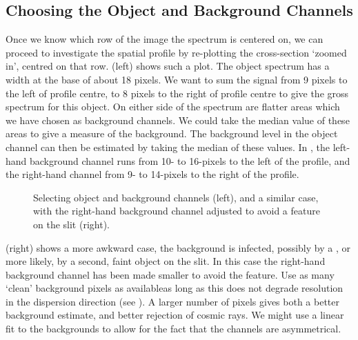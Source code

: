 \subsection{Choosing the Object and Background
            Channels}

Once we know which row of the image the spectrum is centered on, we can
proceed to investigate the spatial profile by re-plotting the
cross-section
`zoomed in', centred on that row.
(left) shows such a plot.
The object spectrum has a width at the base of about 18 pixels.
We want to sum the signal from 9 pixels to the left of profile
centre, to 8 pixels to the right of profile centre to give the
gross spectrum for this object.
On either side of the spectrum are flatter areas which we have
chosen as background channels.
We could take the median value of these areas to give a measure
of the background.
The background level in the object channel can then be estimated
by taking the median of these values.
In ,
the left-hand background channel runs from 10- to 16-pixels to the
left of the profile, and the right-hand channel from 9- to 14-pixels
to the right of the profile.

\begin{figure}
\begin{center}
{\leavevmode\epsfysize=66mm}

\parbox{140mm}{
\caption{Selecting object and background channels (left), and a similar
case, with the right-hand background channel adjusted to avoid a feature
on the slit (right).}
\label{fi_channel_select}
}
\end{center}
\end{figure}

 (right)
shows a more awkward case, the background is infected,
possibly by a ,
or more likely, by a second, faint object on the slit.
In this case the right-hand background channel has been made
smaller to avoid the feature.
Use as many `clean' background pixels as available\scspec{---}{ - }as
long as this does not degrade resolution in the dispersion direction
(see \scspec{\S\ref{extraction}}
{}).
A larger number of pixels gives both a better background
estimate, and better rejection of cosmic rays.
We might use a linear fit to the backgrounds to allow for the fact
that the channels are asymmetrical.


